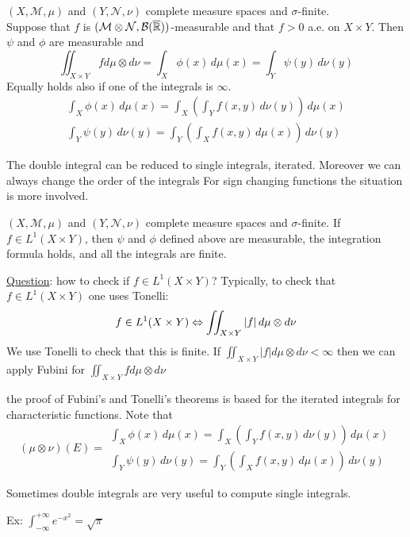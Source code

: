 \begin{theorem}
    \((X, \mathcal{M}, \mu)\) and \((Y, \mathcal{N}, \nu)\) complete measure spaces and \(\sigma\)-finite. \\
    Suppose that \(f\) is \((\mathcal{M} \otimes \mathcal{N}, \mathcal{B}(\overline{\mathbb{R}}))\)-measurable and that \(f > 0\) a.e. on \(X \times Y\). Then \(\psi\) and \(\phi\) are measurable and
    \[
        \iint_{X \times Y} f d\mu \otimes d\nu = \int_X \phi(x) \, d\mu(x) = \int_Y \psi(y) \, d\nu(y) \tag*{Integration formula}
    \]
    Equally holds also if one of the integrals is \(\infty\).
    \[
        \begin{array}{l}
            \int_X \phi(x) \, d\mu(x) = \int_X \left(\int_Y f(x, y) \, d\nu(y) \right) \, d\mu(x) \\
            \int_Y \psi(y) \, d\nu(y) = \int_Y \left(\int_X f(x, y) \, d\mu(x) \right) \, d\nu(y)      
    \end{array}  
    \]
\end{theorem}
\begin{remark}
    The double integral can be reduced to single integrals, iterated. Moreover we can always change the order of the integrals
    For sign changing functions the situation is more involved.
\end{remark}
\begin{theorem}
    \((X, \mathcal{M}, \mu)\) and \((Y, \mathcal{N}, \nu)\) complete measure spaces and \(\sigma\)-finite.
    If \(f \in L^1(X \times Y)\), then \(\psi\) and \(\phi\) defined above are measurable, the integration formula holds, and all the integrals are finite.
\end{theorem}
\underline{Question}: how to check if \(f\in L^1(X \times Y)\)? Typically, to check that \(f \in L^1(X \times Y)\) one uses Tonelli: 
\[
    f \in L^1(X \times Y) \Leftrightarrow \iint_{X \times Y} \abs{f} \, d\mu \otimes d\nu
\]
We use Tonelli to check that this is finite. 
If \(\iint_{X \times Y} \vert f \vert d\mu \otimes d\nu < \infty\) then we can apply Fubini for \(\iint_{X \times Y} f d\mu \otimes d\nu\)
\begin{remark}
    the proof of Fubini's and Tonelli's theorems is based for the iterated integrals for characteristic functions.
    Note that 
    \[(\mu \otimes \nu)(E) = \begin{array}{l}
        \int_X \phi(x) \, d\mu(x) = \int_X \left(\int_Y f(x, y) \, d\nu(y) \right) \, d\mu(x) \\
        \int_Y \psi(y) \, d\nu(y) = \int_Y \left(\int_X f(x, y) \, d\mu(x) \right) \, d\nu(y)
    \end{array}
    \]
\end{remark}
\begin{remark}
    Sometimes double integrals are very useful to compute single integrals.
\end{remark}
Ex: \(\int_{-\infty}^{+\infty}e^{-x^2} = \sqrt{\pi}\)



